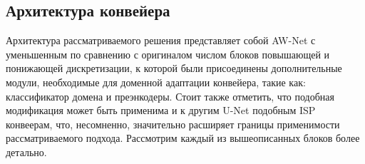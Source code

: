 \subsection{Архитектура конвейера}\label{sect-4-1}

Архитектура рассматриваемого решения представляет собой AW-Net с уменьшенным по сравнению с оригиналом числом блоков повышающей и понижающей дискретизации, к которой были присоединены дополнительные модули, необходимые для доменной адаптации конвейера, такие как: классификатор домена и преэнкодеры. Стоит также отметить, что подобная модификация может быть применима и к другим U-Net подобным ISP конвеерам, что, несомненно, значительно расширяет границы применимости рассматриваемого подхода. Рассмотрим каждый из вышеописанных блоков более детально.


